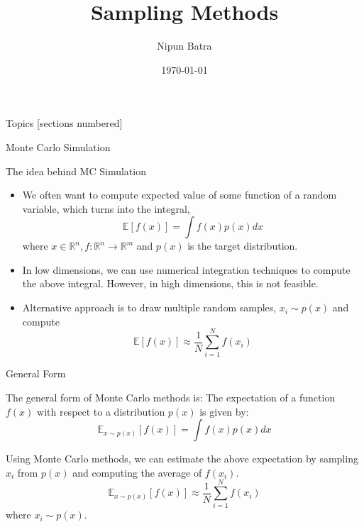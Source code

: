 \documentclass{beamer}
\begin{document}
\title{Sampling Methods}
\author{Nipun Batra}
\date{\today}
\maketitle

\begin{frame}{Topics}
    [sections numbered]
    \tableofcontents[hideallsubsections]

\end{frame}

\begin{section}{Monte Carlo Simulation}

    \begin{frame}{The idea behind MC Simulation}
        \begin{itemize}
            \item We often want to compute expected value of some function of a random variable, which turns into the integral, 
            $$\mathbb{E} \left[ f (x) \right] = \int f(x) p(x) dx$$
            where $x \in \mathbb{R}^n, f: \mathbb{R}^n \rightarrow \mathbb{R}^m$ and $p(x)$ is the target distribution.
            \item In low dimensions, we can use numerical integration techniques to compute the above integral. However, in high dimensions, this is not feasible.
            \item Alternative approach is to draw  multiple random samples, $x_i \sim p(x)$ and compute
            $$\mathbb{E} \left[ f (x) \right] \approx \frac{1}{N} \sum_{i=1}^{N} f(x_i)$$
        \end{itemize}
    \end{frame}

    \begin{frame}{General Form}

        The general form of Monte Carlo methods is:
        The expectation of a function $f(x)$ with respect to a distribution $p(x)$ is given by:
        \begin{equation}
            \mathbb{E}_{x \sim p(x)}[f(x)] = \int f(x) p(x) dx
        \end{equation}
        
        Using Monte Carlo methods, we can estimate the above expectation by sampling $x_i$ from $p(x)$ and computing the average of $f(x_i)$.
        \begin{equation}
            \mathbb{E}_{x \sim p(x)}[f(x)] \approx \frac{1}{N} \sum_{i=1}^{N} f(x_i)
        \end{equation}
        where $x_i \sim p(x)$.


\end{frame}
\end{section}
\end{document}
